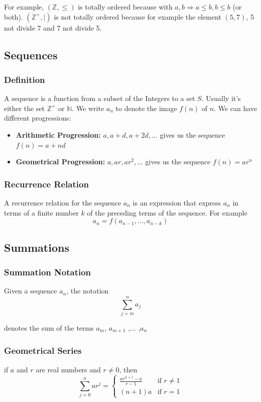 \documentclass{article}
\begin{document}
For example, $ (\mathbb{Z}, \leq) $ is totally ordered because with $ a,b \Rightarrow a \leq b,b\leq b $ (or both). $ (\mathbb{Z^+}, |) $ is not totally ordered because for example the element $ (5,7) $, 5 not divide 7 and 7 not divide 5.

\subsection{Sequences}
\subsubsection{Definition} A sequence is a function from a subset of the Integers to a set $ S $. Usually it's either the set $ \mathbb{Z^+} $ or $ \mathbb{N} $. We write $ a_n $ to denote the image $ f(n) $ of $ n $. We can have different progressions:
\begin{itemize}
\item \textbf{Arithmetic Progression:} $ a,a+d,a+2d,... $ gives us the sequence $ f(n) = a + nd $
\item \textbf{Geometrical Progression:} $ a,ar,ar^2,... $ gives us the sequence $ f(n) = ar^n $
\end{itemize}

\subsubsection{Recurrence Relation} A recurrence relation for the sequence $ a_n $ is an expression that express $ a_n $ in terms of a finite number $ k $ of the preceding terms of the sequence. For example 
\begin{equation}
a_n = f(a_{n-1},...,a_{n-k})
\end{equation}

\subsection{Summations}
\subsubsection{Summation Notation} Given a sequence $ a_n $, the notation
\begin{equation}
\sum_{j = m}^{n} a_j
\end{equation}

denotes the sum of the terms $ a_m $, $ a_{m+1} $ ,... ,$ a_n $

\subsubsection{Geometrical Series} if $ a $ and $ r $ are real numbers and $ r \neq 0 $, then
\begin{equation}
\sum_{j=0}^{n} ar^j = \left\{
    \begin{array}{ll}
        \frac{ar^{n+1} - a}{r - 1} & \mbox{if } r \neq 1 \\
        (n + 1)a & \mbox{if } r = 1
    \end{array}
\right.
\end{equation}
\end{document}
